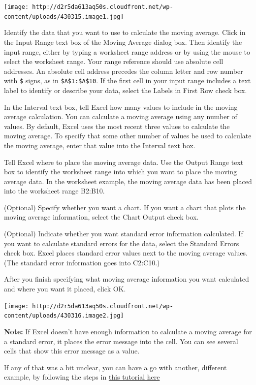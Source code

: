 \documentclass[]{book}
\theoremstyle{definition}
\theoremstyle{definition}
\theoremstyle{definition}
\theoremstyle{remark}
\begin{document}
\texttt{[image: http://d2r5da613aq50s.cloudfront.net/wp-content/uploads/430315.image1.jpg]}

Identify the data that you want to use to calculate the moving average.
Click in the Input Range text box of the Moving Average dialog box. Then
identify the input range, either by typing a worksheet range address or
by using the mouse to select the worksheet range. Your range reference
should use absolute cell addresses. An absolute cell address precedes
the column letter and row number with \texttt{\$} signs, as in
\texttt{\$A\$1:\$A\$10}. If the first cell in your input range includes
a text label to identify or describe your data, select the Labels in
First Row check box.

In the Interval text box, tell Excel how many values to include in the
moving average calculation. You can calculate a moving average using any
number of values. By default, Excel uses the most recent three values to
calculate the moving average. To specify that some other number of
values be used to calculate the moving average, enter that value into
the Interval text box.

Tell Excel where to place the moving average data. Use the Output Range
text box to identify the worksheet range into which you want to place
the moving average data. In the worksheet example, the moving average
data has been placed into the worksheet range B2:B10.

(Optional) Specify whether you want a chart. If you want a chart that
plots the moving average information, select the Chart Output check box.

(Optional) Indicate whether you want standard error information
calculated. If you want to calculate standard errors for the data,
select the Standard Errors check box. Excel places standard error values
next to the moving average values. (The standard error information goes
into C2:C10.)

After you finish specifying what moving average information you want
calculated and where you want it placed, click OK.

\texttt{[image: http://d2r5da613aq50s.cloudfront.net/wp-content/uploads/430316.image2.jpg]}

\textbf{Note:} If Excel doesn't have enough information to calculate a
moving average for a standard error, it places the error message into
the cell. You can see several cells that show this error message as a
value.

If any of that was a bit unclear, you can have a go with another,
different example, by following the steps in
\href{http://www.excel-easy.com/examples/moving-average.html}{this
tutorial here}
\end{document}
